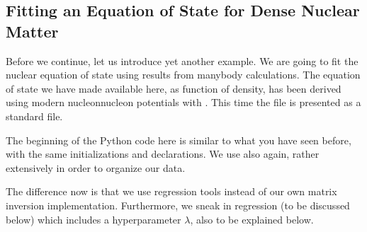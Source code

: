 \documentclass[letterpaper,10pt,english]{sphinxmanual}
\begin{document}
\subsection{Fitting an Equation of State for Dense Nuclear Matter}
\label{\detokenize{chapter4:fitting-an-equation-of-state-for-dense-nuclear-matter}}
Before we continue, let us introduce yet another example. We are going to fit the
nuclear equation of state using results from many\sphinxhyphen{}body calculations.
The equation of state we have made available here, as function of
density, has been derived using modern nucleon\sphinxhyphen{}nucleon potentials with
. This
time the file is presented as a standard  file.

The beginning of the Python code here is similar to what you have seen
before, with the same initializations and declarations. We use also
 again, rather extensively in order to organize our data.

The difference now is that we use  regression tools
instead of our own matrix inversion implementation. Furthermore, we
sneak in  regression (to be discussed below) which includes a
hyperparameter \(\lambda\), also to be explained below.
\end{document}

